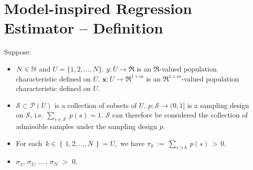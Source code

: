 

\section{Model-inspired Regression Estimator -- Definition}
\setcounter{theorem}{0}
\setcounter{equation}{0}


\renewcommand{\theenumi}{\roman{enumi}}
\renewcommand{\labelenumi}{\textnormal{(\theenumi)}$\;\;$}


\begin{definition}
\mbox{}
\vskip 0.05cm
\noindent
Suppose:
\begin{itemize}
\item
	$N \in \mathbb{N}$ and $U = \{1,2,\ldots,N\}$.
	\vskip 0.05cm
	$y : U \longrightarrow \Re$ is an $\Re$-valued population characteristic defined on $U$.
	\vskip 0.05cm
	$\mathbf{x} : U \longrightarrow \Re^{1 \times m}$ is an $\Re^{1 \times m}$-valued population characteristic defined on $U$.
\item
	$\mathcal{S} \subset \mathcal{P}(U)$ is a collection of subsets of $U$.
	$p : \mathcal{S} \longrightarrow (0,1]$ is a sampling design on $\mathcal{S}$,
	i.e. $\underset{s\in\mathcal{S}}{\sum}\;p(s) = 1$.
	\vskip 0.05cm
	$\mathcal{S}$ can therefore be considered the collection of admissible samples under the sampling design $p$.
\item
	For each \,$k \in \left\{\,1,2,\ldots,N\,\right\} = U$,\, we have
	$\pi_{k} \,:=\, \underset{s \ni k}{\sum}\,p(s) \,>\, 0$.
\item
	$\sigma_{1}$, $\sigma_{2}$, $\ldots$\,, $\sigma_{N}$ $>$ $0$.
\end{itemize}

\end{definition}

